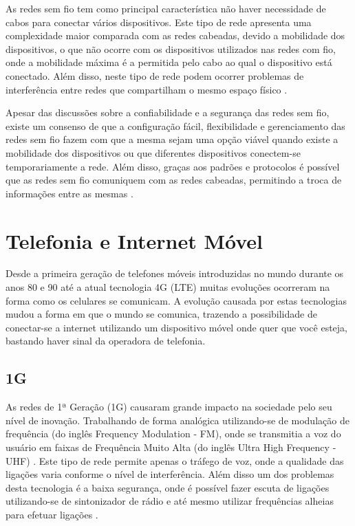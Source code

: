 As redes sem fio tem como principal característica não haver necessidade de cabos para conectar vários dispositivos. Este tipo de rede apresenta uma complexidade maior comparada com as redes cabeadas, devido a mobilidade dos dispositivos, o que não ocorre com os dispositivos utilizados nas redes com fio, onde a mobilidade máxima é a permitida pelo cabo ao qual o dispositivo está conectado. Além disso, neste tipo de rede podem ocorrer problemas de interferência entre redes que compartilham o mesmo espaço físico \cite{IEEE80211}.

Apesar das discussões sobre a confiabilidade e a segurança das redes sem fio, existe um consenso de que a configuração fácil, flexibilidade e gerenciamento das redes sem fio fazem com que a mesma sejam uma opção viável quando existe a mobilidade dos dispositivos ou que diferentes dispositivos conectem-se temporariamente a rede. Além disso, graças aos padrões e protocolos é possível que as redes sem fio comuniquem com as redes cabeadas, permitindo a troca de informações entre as mesmas \cite{RedesSemFioUFLA}.

\section{Telefonia e Internet Móvel}
Desde a primeira geração de telefones móveis introduzidas no mundo durante os anos 80 e 90  até a atual tecnologia 4G (LTE) muitas evoluções ocorreram na forma como os celulares se comunicam. A evolução causada por estas tecnologias mudou a forma em que o mundo se comunica, trazendo a possibilidade de conectar-se a internet utilizando um dispositivo móvel onde quer que você esteja, bastando haver sinal da operadora de telefonia.

\subsection{1G}
As redes de 1ª Geração (1G) causaram grande impacto na sociedade pelo seu nível de inovação. Trabalhando de forma analógica utilizando-se de modulação de frequência (do inglês Frequency Modulation - FM), onde se transmitia a voz do usuário em faixas de Frequência Muito Alta (do inglês Ultra High Frequency - UHF) \cite{AEvolucaoTelefoniaCelular}. Este tipo de rede permite apenas o tráfego de voz, onde a qualidade das ligações varia conforme o nível de interferência. Além disso um dos problemas desta tecnologia é a baixa segurança, onde é possível fazer escuta de ligações utilizando-se de sintonizador de rádio e até mesmo utilizar frequências alheias para efetuar ligações  \cite{GeracoesTelefoniaMovel}.

